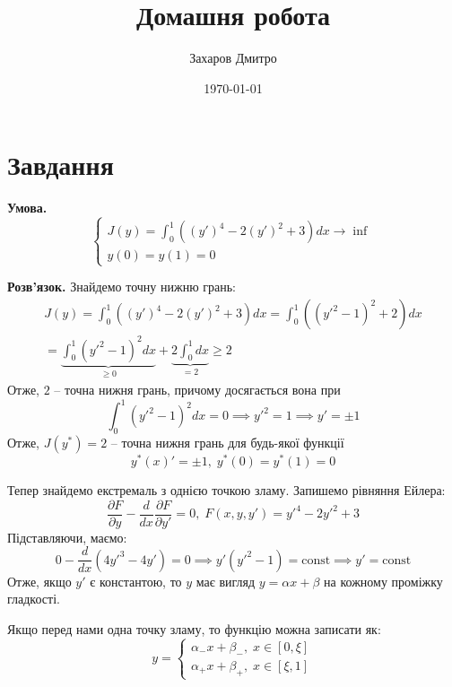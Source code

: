\documentclass[oneside,solution]{template}
\title{Домашня робота}
\author{Захаров Дмитро}
\date{\today}
\begin{document}
\maketitle

\section{Завдання}

\textbf{Умова.}
\begin{equation*}
    \begin{cases}
        J(y) = \int_0^1 ((y')^4 - 2(y')^2+3)dx \to \inf \\
        y(0) = y(1) = 0
    \end{cases}
\end{equation*}

\textbf{Розв'язок.} Знайдемо точну нижню грань:
\begin{gather*}
    J(y) = \int_0^1 ((y')^4 - 2(y')^2 + 3)dx = \int_0^1 ((y'^2-1)^2 + 2)dx \\
    = \underbrace{\int_0^1 (y'^2-1)^2dx}_{\geq 0} + \underbrace{2\int_0^1 dx}_{=2} \geq 2
\end{gather*}
Отже, $2$ -- точна нижня грань, причому досягається вона при
\begin{equation*}
    \int_0^1 (y'^2 - 1)^2dx = 0 \implies y'^2 = 1 \implies y' = \pm 1
\end{equation*}
Отже, $J(y^*)=2$ -- точна нижня грань для будь-якої функції
\begin{equation*}
    y^*(x)' = \pm 1, \; y^*(0) = y^*(1) = 0
\end{equation*}

Тепер знайдемо екстремаль з однією точкою зламу. Запишемо рівняння Ейлера:
\begin{equation*}
    \frac{\partial F}{\partial y} - \frac{d}{d x} \frac{\partial F}{\partial y'} = 0, \; F(x,y,y') = y'^4 - 2y'^2+3
\end{equation*}
Підставляючи, маємо:
\begin{equation*}
    0 - \frac{d}{dx}\left(4y'^3 - 4y'\right) = 0 \implies y'(y'^2-1) = \text{const} \implies y' = \text{const}
\end{equation*}
Отже, якщо $y'$ є константою, то $y$ має вигляд $y=\alpha x + \beta$ на кожному проміжку гладкості.

Якщо перед нами одна точку зламу, то функцію можна записати як:
\begin{equation*}
    y = \begin{cases}
        \alpha_- x + \beta_-, \; x \in [0,\xi] \\
        \alpha_+ x + \beta_+, \; x \in [\xi,1]
    \end{cases}
\end{equation*}
\end{document}
